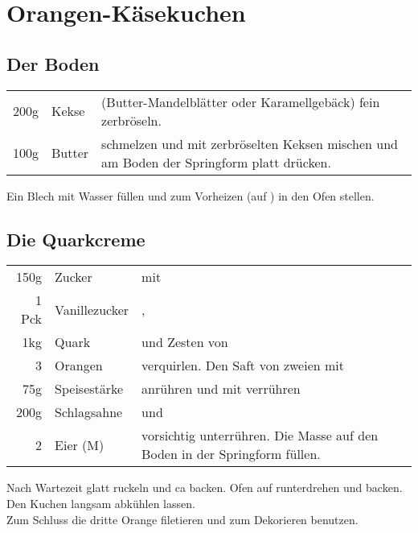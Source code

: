 \section{Orangen-Käsekuchen}
\subsection*{Der Boden}
\begin{longtable}{rlL{18.6cm}}
	200g	&	Kekse	&	(Butter-Mandelblätter oder Karamellgebäck) fein zerbröseln. \\
	100g	&	Butter	&	schmelzen und mit zerbröselten Keksen mischen und am Boden der Springform platt drücken. \\
\end{longtable}

 Ein Blech mit Wasser füllen und zum Vorheizen (auf ) in den Ofen stellen. \\

\subsection*{Die Quarkcreme}
\begin{longtable}{rlL{17.2cm}}
	150g	&	Zucker			&	mit \\
	1 Pck	&	Vanillezucker	&	, \\
	1kg		&	Quark			&	und Zesten von \\
	3		&	Orangen			&	verquirlen.
									Den Saft von zweien mit \\
	75g		&	Speisestärke	&	anrühren und mit verrühren\\
	200g	&	Schlagsahne		&	und \\
	2		&	Eier (M)		&	vorsichtig unterrühren.
									Die Masse auf den Boden in der Springform füllen.\\
\end{longtable}

Nach  Wartezeit glatt ruckeln und ca  backen. Ofen auf  runterdrehen und  backen.
Den Kuchen langsam abkühlen lassen. \\
Zum Schluss die dritte Orange filetieren und zum Dekorieren benutzen.